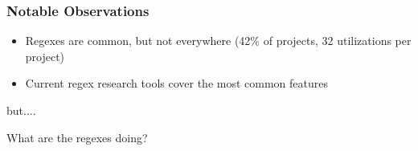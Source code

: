 \begin{frame}
\frametitle{Notable Observations}

\begin{block}{}
\begin{itemize}
	\item Regexes are common, but not everywhere (42\% of projects, 32 utilizations per project)
	\item Current regex research tools cover the most common features
\end{itemize}
\end{block}

but....

\begin{block}{}
What are the regexes doing?
\end{block}


\end{frame}

